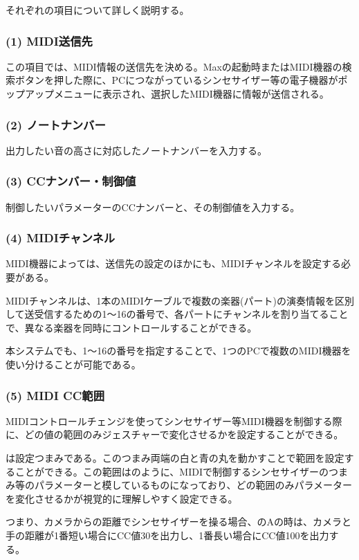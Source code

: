それぞれの項目について詳しく説明する。

\subsubsection*{(1) MIDI送信先}
この項目では、MIDI情報の送信先を決める。Maxの起動時またはMIDI機器の検索ボタンを押した際に、PCにつながっているシンセサイザー等の電子機器がポップアップメニューに表示され、選択したMIDI機器に情報が送信される。

\subsubsection*{(2) ノートナンバー}
出力したい音の高さに対応したノートナンバーを入力する。

\subsubsection*{(3) CCナンバー・制御値}
制御したいパラメーターのCCナンバーと、その制御値を入力する。

\subsubsection*{(4) MIDIチャンネル}
MIDI機器によっては、送信先の設定のほかにも、MIDIチャンネルを設定する必要がある。

MIDIチャンネルは、1本のMIDIケーブルで複数の楽器(パート)の演奏情報を区別して送受信するための1〜16の番号で、各パートにチャンネルを割り当てることで、異なる楽器を同時にコントロールすることができる。

本システムでも、1〜16の番号を指定することで、1つのPCで複数のMIDI機器を使い分けることが可能である。

\subsubsection*{(5) MIDI CC範囲}
MIDIコントロールチェンジを使ってシンセサイザー等MIDI機器を制御する際に、どの値の範囲のみジェスチャーで変化させるかを設定することができる。

は設定つまみである。このつまみ両端の白と青の丸を動かすことで範囲を設定することができる。この範囲はのように、MIDIで制御するシンセサイザーのつまみ等のパラメーターと模しているものになっており、どの範囲のみパラメーターを変化させるかが視覚的に理解しやすく設定できる。

つまり、カメラからの距離でシンセサイザーを操る場合、のAの時は、カメラと手の距離が1番短い場合にCC値30を出力し、1番長い場合にCC値100を出力する。

